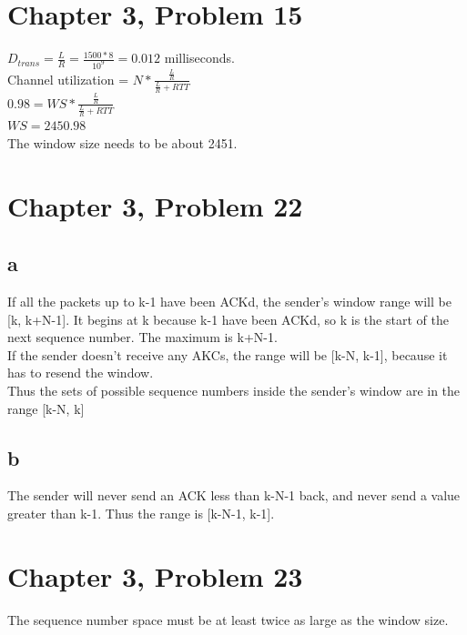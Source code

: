 \documentclass{article}
\begin{document}
\section*{Chapter 3, Problem 15}
$D_{trans} = \frac{L}{R} = \frac{1500*8}{10^{9}} = 0.012$ milliseconds.\\
\newline Channel utilization = $N*\frac{\frac{L}{R}}{\frac{L}{R}+RTT}$\\
\newline $0.98 = WS*\frac{\frac{L}{R}}{\frac{L}{R}+RTT}$\\
\newline $WS = 2450.98$\\
\newline The window size needs to be about 2451.\\

\section*{Chapter 3, Problem 22}
\subsection*{a}
If all the packets up to k-1 have been ACKd, the sender's window range will be [k, k+N-1].  It begins at k because k-1 have been ACKd, so k is the start of the next sequence number.  The maximum is k+N-1.\\
\newline If the sender doesn't receive any AKCs, the range will be [k-N, k-1], because it has to resend the window.\\
\newline Thus the sets of possible sequence numbers inside the sender's window are in the range [k-N, k]\\

\subsection*{b}
The sender will never send an ACK less than k-N-1 back, and never send a value greater than k-1.  Thus the range is [k-N-1, k-1].\\
\clearpage

\section*{Chapter 3, Problem 23}
The sequence number space must be at least twice as large as the window size.\\
\end{document}

